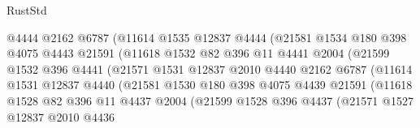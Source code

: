 \begin{lexlean}{RustStd}
\begin{coremodule}
                            @4444
                            @2162
                            @6787
                            (@11614
                              @1535
                              @12837
                              @4444
                              (@21581
                                @1534
                                @180
                                @398
                                @4075
                                @4443
                                @21591
                                (@11618
                                  @1532
                                  @82
                                  @396
                                  @11
                                  @4441
                                  @2004
                                  (@21599
                                    @1532
                                    @396
                                    @4441
                                    (@21571
                                      @1531
                                      @12837
                                      @2010
                                      @4440
                                      @2162
                                      @6787
                                      (@11614
                                        @1531
                                        @12837
                                        @4440
                                        (@21581
                                          @1530
                                          @180
                                          @398
                                          @4075
                                          @4439
                                          @21591
                                          (@11618
                                            @1528
                                            @82
                                            @396
                                            @11
                                            @4437
                                            @2004
                                            (@21599
                                              @1528
                                              @396
                                              @4437
                                              (@21571
                                                @1527
                                                @12837
                                                @2010
                                                @4436

\end{coremodule}
\end{lexlean}
